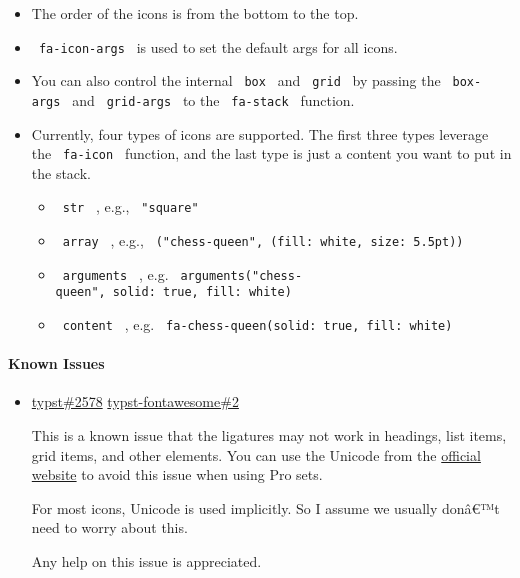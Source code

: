 \begin{itemize}
\tightlist
\item
  The order of the icons is from the bottom to the top.
\item
  \texttt{\ fa-icon-args\ } is used to set the default args for all
  icons.
\item
  You can also control the internal \texttt{\ box\ } and
  \texttt{\ grid\ } by passing the \texttt{\ box-args\ } and
  \texttt{\ grid-args\ } to the \texttt{\ fa-stack\ } function.
\item
  Currently, four types of icons are supported. The first three types
  leverage the \texttt{\ fa-icon\ } function, and the last type is just
  a content you want to put in the stack.

  \begin{itemize}
  \tightlist
  \item
    \texttt{\ str\ } , e.g., \texttt{\ "square"\ }
  \item
    \texttt{\ array\ } , e.g.,
    \texttt{\ ("chess-queen",\ (fill:\ white,\ size:\ 5.5pt))\ }
  \item
    \texttt{\ arguments\ } , e.g.
    \texttt{\ arguments("chess-queen",\ solid:\ true,\ fill:\ white)\ }
  \item
    \texttt{\ content\ } , e.g.
    \texttt{\ fa-chess-queen(solid:\ true,\ fill:\ white)\ }
  \end{itemize}
\end{itemize}

\paragraph{Known Issues}\label{known-issues}

\begin{itemize}
\item
  \href{https://github.com/typst/typst/issues/2578}{typst\#2578}
  \href{https://github.com/duskmoon314/typst-fontawesome/issues/2}{typst-fontawesome\#2}

  This is a known issue that the ligatures may not work in headings,
  list items, grid items, and other elements. You can use the Unicode
  from the \href{https://fontawesome.com/}{official website} to avoid
  this issue when using Pro sets.

  For most icons, Unicode is used implicitly. So I assume we usually
  donâ€™t need to worry about this.

  Any help on this issue is appreciated.
\end{itemize}

